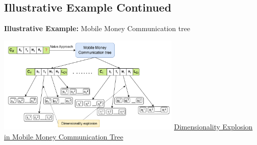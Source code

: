 \documentclass[11pt,aspectratio=169]{beamer}
\begin{document}
			\subsection{Illustrative Example Continued}
		\begin{frame}{\normalsize{{\textbf{Illustrative Example:} Mobile Money Communication tree}}}

			
			\centering
			\includegraphics[width=250pt]{./assets/example.png}
			\underline {Dimensionality Explosion in Mobile Money Communication Tree}
			\
	
		
		
		
		
	\end{frame}	
\end{document}
